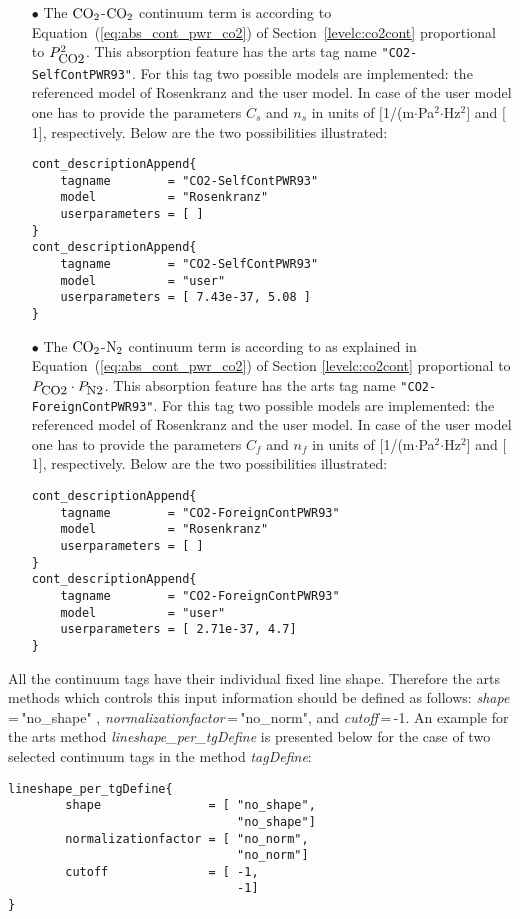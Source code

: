 \begin{itemize}
\item[$\bullet$] The \citet{pwr:93} $\mbox{CO}_2$-$\mbox{CO}_2$ continuum term is
  according to Equation~(\ref{eq:abs_cont_pwr_co2}) of
  Section~\ref{levelc:co2cont} proportional to $P_{\mbox{\rm \small CO2}}^2$. This
  absorption feature has the arts tag name {\tt "CO2-SelfContPWR93"}.
  For this tag two possible models are implemented: the referenced
  model of Rosenkranz and the user model. In case of the user model
  one has to provide the parameters $C_s$ and $n_s$ in units of
  $[$1/(m$\cdot$Pa$^2$$\cdot$Hz$^2$$]$ and $[$1$]$, respectively.
  Below are the two possibilities illustrated:
\begin{lstlisting}
cont_descriptionAppend{
    tagname        = "CO2-SelfContPWR93"
    model          = "Rosenkranz"
    userparameters = [ ]
}
cont_descriptionAppend{
    tagname        = "CO2-SelfContPWR93"
    model          = "user"
    userparameters = [ 7.43e-37, 5.08 ]
}
\end{lstlisting}

  
\item[$\bullet$] The \citet{pwr:93} $\mbox{CO}_2$-$\mbox{N}_2$ continuum term is
  according to as explained in Equation~(\ref{eq:abs_cont_pwr_co2}) of
  Section \ref{levelc:co2cont} proportional to $P_{\mbox{\rm \small CO2}} \cdot P_{\mbox{\rm \small N2}}$.
  This absorption feature has the arts tag name 
  {\tt"CO2-ForeignContPWR93"}. For this tag two possible models are
  implemented: the referenced model of Rosenkranz and the user model.
  In case of the user model one has to provide the parameters $C_f$
  and $n_f$ in units of $[$1/(m$\cdot$Pa$^2$$\cdot$Hz$^2$$]$ and
  $[$1$]$, respectively.  Below are the two possibilities illustrated:
\begin{lstlisting}
cont_descriptionAppend{
    tagname        = "CO2-ForeignContPWR93"
    model          = "Rosenkranz"
    userparameters = [ ]
}
cont_descriptionAppend{
    tagname        = "CO2-ForeignContPWR93"
    model          = "user"
    userparameters = [ 2.71e-37, 4.7]
}
\end{lstlisting}
\end{itemize}

All the continuum tags have their individual fixed line shape. 
Therefore the arts methods which controls this input information
should be defined as follows:  {\it shape}\,=\,"no\_shape" , 
{\it normalizationfactor}\,=\,"no\_norm", and {\it cutoff}\,=\,-1. An 
example for the arts method {\it lineshape\_per\_tgDefine} is presented 
below for the case of two selected continuum tags in the method 
{\it tagDefine}:
\begin{lstlisting}
lineshape_per_tgDefine{
        shape               = [ "no_shape", 
                                "no_shape"]
        normalizationfactor = [ "no_norm", 
                                "no_norm"]
        cutoff              = [ -1,
                                -1]
}
\end{lstlisting}

